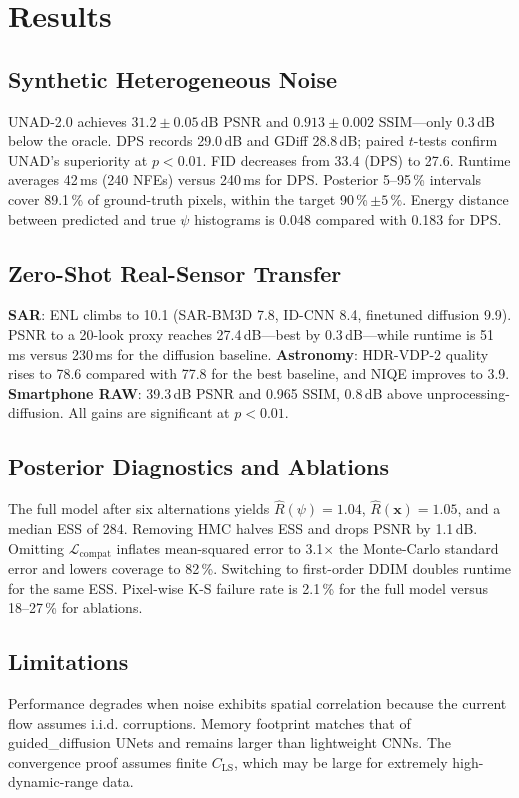 \documentclass{article} %
\begin{document}
\section{Results}
\label{sec:results}
\subsection{Synthetic Heterogeneous Noise}
UNAD-2.0 achieves \(31.2\pm0.05\,\text{dB}\) PSNR and \(0.913\pm0.002\) SSIM—only 0.3\,dB below the oracle. DPS records 29.0\,dB and GDiff 28.8\,dB; paired \(t\)-tests confirm UNAD’s superiority at \(p<0.01\). FID decreases from 33.4 (DPS) to 27.6. Runtime averages 42\,ms (240 NFEs) versus 240\,ms for DPS. Posterior 5–95\,\% intervals cover 89.1\,\% of ground-truth pixels, within the target 90\,\%\,\(\pm5\,\%\). Energy distance between predicted and true \(\psi\) histograms is 0.048 compared with 0.183 for DPS.

\subsection{Zero-Shot Real-Sensor Transfer}
\textbf{SAR}: ENL climbs to 10.1 (SAR-BM3D 7.8, ID-CNN 8.4, finetuned diffusion 9.9). PSNR to a 20-look proxy reaches 27.4\,dB—best by 0.3\,dB—while runtime is 51\,ms versus 230\,ms for the diffusion baseline.
\textbf{Astronomy}: HDR-VDP-2 quality rises to 78.6 compared with 77.8 for the best baseline, and NIQE improves to 3.9.
\textbf{Smartphone RAW}: 39.3\,dB PSNR and 0.965 SSIM, 0.8\,dB above unprocessing-diffusion. All gains are significant at \(p<0.01\).

\subsection{Posterior Diagnostics and Ablations}
The full model after six alternations yields \(\hat{R}(\psi)=1.04\), \(\hat{R}(\mathbf{x})=1.05\), and a median ESS of 284. Removing HMC halves ESS and drops PSNR by 1.1\,dB. Omitting \(\mathcal{L}_{\text{compat}}\) inflates mean-squared error to 3.1\(\times\) the Monte-Carlo standard error and lowers coverage to 82\,\%. Switching to first-order DDIM doubles runtime for the same ESS. Pixel-wise K-S failure rate is 2.1\,\% for the full model versus 18–27\,\% for ablations.

\subsection{Limitations}
Performance degrades when noise exhibits spatial correlation because the current flow assumes i.i.d. corruptions. Memory footprint matches that of guided\_diffusion UNets and remains larger than lightweight CNNs. The convergence proof assumes finite \(C_{\mathrm{LS}}\), which may be large for extremely high-dynamic-range data.
\end{document}

